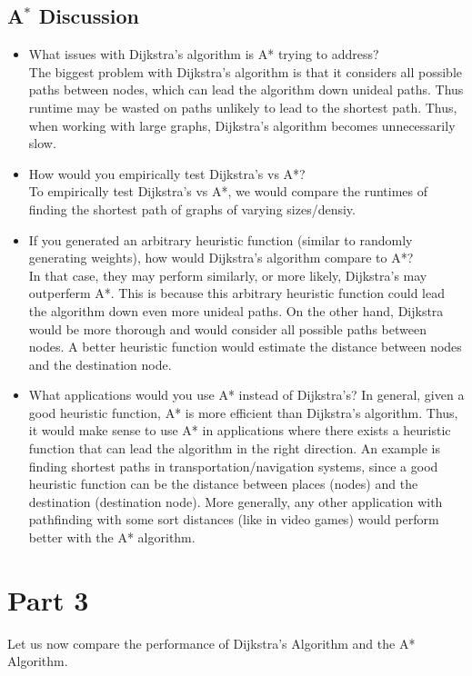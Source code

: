\documentclass{article}
\begin{document}
\subsection{A$^{*}$ Discussion}
\begin{itemize}
    \item What issues with Dijkstra’s algorithm is A* trying to address?\\
        The biggest problem with Dijkstra’s algorithm is that it considers all possible paths between nodes, which can lead the algorithm down unideal paths. Thus runtime may be wasted on paths unlikely to lead to the shortest path. 
        Thus, when working with large graphs, Dijkstra’s algorithm becomes unnecessarily slow. 
    \item How would you empirically test Dijkstra’s vs A*?\\
        To empirically test Dijkstra’s vs A*, we would compare the runtimes of finding the shortest path of graphs of varying sizes/densiy. 
    \item If you generated an arbitrary heuristic function (similar to randomly generating weights), how would Dijkstra’s algorithm compare to A*?\\
        In that case, they may perform similarly, or more likely, Dijkstra’s may outperferm A*. This is because this arbitrary heuristic function could lead the algorithm down even more unideal paths. On the other hand, Dijkstra would be more thorough and would consider all possible paths between nodes. A better heuristic function would estimate the distance between nodes and the destination node. 
    \item What applications would you use A* instead of Dijkstra’s?
        In general, given a good heuristic function, A* is more efficient than Dijkstra’s algorithm. Thus, it would make sense to use A* in applications where there exists a heuristic function that can lead the algorithm in the right direction. 
        An example is finding shortest paths in transportation/navigation systems, since a good heuristic function can be the distance between places (nodes) and the destination (destination node). More generally, any other application with pathfinding with some sort distances (like in video games) would perform better with the A* algorithm. 

\end{itemize}


\newpage
\section{Part 3}
Let us now compare the performance of Dijkstra’s Algorithm and the A* Algorithm. 
\end{document}
